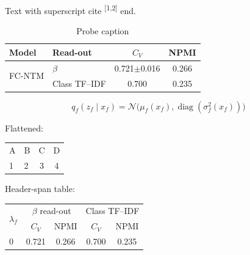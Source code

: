 \documentclass{article}
\begin{document}
Text with superscript cite \textsuperscript{[1,2]} end.

\begin{table}[t]
\centering
\caption{Probe caption}
\label{tab:probe}
\footnotesize
\setlength{\tabcolsep}{4pt}
\begin{tabular}{@{}llcc@{}}
\toprule
Model & Read-out & $C_V$ & NPMI \\
\midrule
\multirow{2}{*}{FC-NTM} & $\beta$ & 0.721$\pm$0.016 & 0.266 \\
 & Class TF--IDF & 0.700 & 0.235 \\
\bottomrule
\end{tabular}
\end{table}

\begin{equation}
q_f(z_f\mid x_f)=\mathcal N\big(\mu_f(x_f),\operatorname{diag}(\sigma_f^2(x_f))\big)
\label{eq:probe}
\end{equation}

Flattened: \begin{tabular}{llcc} A & B & C & D \\ 1 & 2 & 3 & 4 \end{tabular}

Header-span table: \begin{tabular}{lcccc} \multirow{2}{*}{$\lambda_f$} & \multicolumn{2}{c}{$\beta$ read-out} & \multicolumn{2}{c}{Class TF--IDF} \\ & $C_V$ & NPMI & $C_V$ & NPMI \\ 0 & 0.721 & 0.266 & 0.700 & 0.235 \\ \end{tabular}
\end{document}
